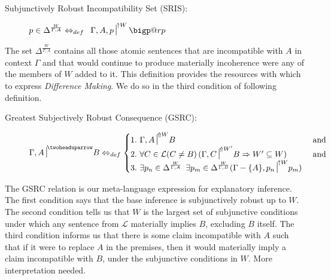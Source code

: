 \documentclass{article}
\makeatletter
\newcommand{\nc}{\turnstile{s}{w}{}{}{n}}
\newcommand{\bigperp}{%
  \mathop{\mathpalette\bigp@rp\relax}%
  \displaylimits
}
\newcommand{\bigp@rp}[2]{%
  \vcenter{
    \m@th\hbox{\scalebox{\ifx#1\displaystyle2.1\else1.5\fi}{$#1\perp$}}
  }%
}
\makeatother
\begin{document}
\begin{description}
	\item[Subjunctively Robust Incompatibility Set (SRIS):]
	
	 $ p \in \Delta^\frac{W}{\Gamma, A}   \Leftrightarrow_{def} \,\,\,{\Gamma, A, p \nc}^{\uparrow W}\bigperp $

\end{description}

The set $ \Delta^\frac{W}{\Gamma, A}  $ contains all those atomic sentences that are incompatible with $A$ in context $ \Gamma $ and that would continue to produce materially incoherence were any of the members of $W$ added to it. This definition provides the resources with which to express \textit{Difference Making}. We do so in the third condition of following definition.

\begin{description}
	\item[Greatest Subjectively Robust Consequence (GSRC):]
		\begin{equation}
		    {\Gamma, A \nc}^{\twoheaduparrow} B  \Leftrightarrow_{def}  
		    \begin{cases}\nonumber
		      1.\,\, {\Gamma, A\nc}^{\Uparrow W} B & $ and $ \\
			  2.\,\, \forall C\in\mathcal{L}(C \neq B)\,({\Gamma, C\nc}^{\Uparrow W'} B \Rightarrow W'\subseteq W ) & $ and $ \\
			  3.\,\, \exists p_{n} \in \Delta^\frac{W}{\Gamma, A} \,\,\,\exists p_{m} \in  \Delta^\frac{W}{\Gamma, B} ({\Gamma -\{A\}, p_{n} \nc}^{\uparrow W} p_{m}) 
		    \end{cases}
		\end{equation}

\end{description}

The GSRC relation is our meta-language expression for explanatory inference. The first condition says that the base inference is subjunctively robust up to $W$. The second condition tells us that $W$ is the largest set of subjunctive conditions under which any sentence from $\mathcal{L}$ materially implies $B$, excluding $B$ itself. The third condition informs us that there is some claim incompatible with $A$ such that if it were to replace $A$ in the premises, then it would materially imply a claim incompatible with $B$, under the subjunctive conditions in $W$. \color{red} More interpretation needed. \color{black}

\end{document}
